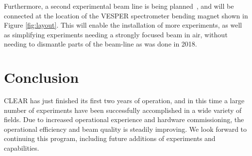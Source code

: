 \documentclass[a4paper,
               keeplastbox,   %
               ]{jacow}
\begin{document}
Furthermore, a second experimental beam line is being planned~\cite{Roberto::CLEARrev}, and will be connected at the location of the VESPER spectrometer bending magnet shown in Figure \ref{fig:layout}.
This will enable the installation of more experiments, as well as simplifying experiments needing a strongly focused beam in air, without needing to dismantle parts of the beam-line as was done in 2018.

\section{Conclusion}

CLEAR has just finished its first two years of operation, and in this time a large number of experiments have been successfully accomplished in a wide variety of fields.
Due to increased operational experience and hardware commissioning, the operational efficiency and beam quality is steadily improving.
We look forward to continuing this program, including future additions of experiments and capabilities.
\end{document}
